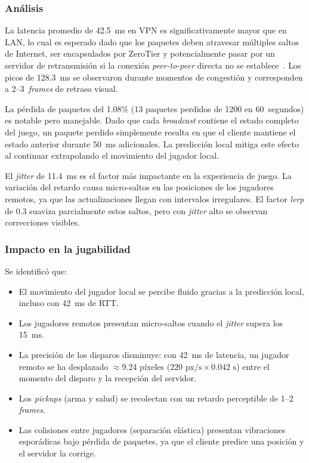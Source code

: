 \documentclass[conference]{IEEEtran}
\begin{document}
\subsubsection{An\'alisis}

La latencia promedio de 42.5~ms en VPN es significativamente mayor que en LAN, lo cual es esperado dado que los paquetes deben atravesar m\'ultiples saltos de Internet, ser encapsulados por ZeroTier y potencialmente pasar por un servidor de retransmisi\'on si la conexi\'on \textit{peer-to-peer} directa no se establece~\cite{tanenbaum2011}. Los picos de 128.3~ms se observaron durante momentos de congesti\'on y corresponden a 2--3~\textit{frames} de retraso visual.

La p\'erdida de paquetes del 1.08\% (13 paquetes perdidos de 1200 en 60~segundos) es notable pero manejable. Dado que cada \textit{broadcast} contiene el estado completo del juego, un paquete perdido simplemente resulta en que el cliente mantiene el estado anterior durante 50~ms adicionales. La predicci\'on local mitiga este efecto al continuar extrapolando el movimiento del jugador local.

El \textit{jitter} de 11.4~ms es el factor m\'as impactante en la experiencia de juego. La variaci\'on del retardo causa micro-saltos en las posiciones de los jugadores remotos, ya que las actualizaciones llegan con intervalos irregulares. El factor \textit{lerp} de 0.3 suaviza parcialmente estos saltos, pero con \textit{jitter} alto se observan correcciones visibles.

\subsubsection{Impacto en la jugabilidad}

Se identific\'o que:
\begin{itemize}
    \item El movimiento del jugador local se percibe fluido gracias a la predicci\'on local, incluso con 42~ms de RTT.
    \item Los jugadores remotos presentan micro-saltos cuando el \textit{jitter} supera los 15~ms.
    \item La precisi\'on de los disparos disminuye: con 42~ms de latencia, un jugador remoto se ha desplazado $\approx$9.24 p\'ixeles ($220 \text{ px/s} \times 0.042 \text{ s}$) entre el momento del disparo y la recepci\'on del servidor.
    \item Los \textit{pickups} (arma y salud) se recolectan con un retardo perceptible de 1--2 \textit{frames}.
    \item Las colisiones entre jugadores (separaci\'on el\'astica) presentan vibraciones espor\'adicas bajo p\'erdida de paquetes, ya que el cliente predice una posici\'on y el servidor la corrige.
\end{itemize}
\end{document}

